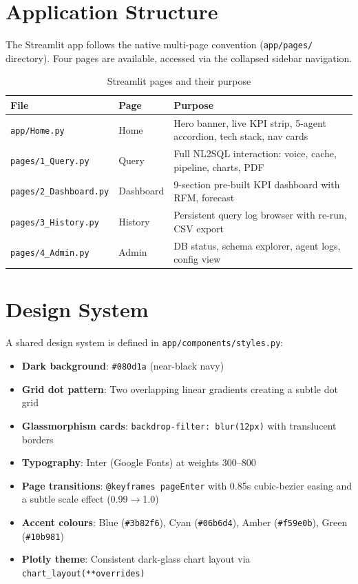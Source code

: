 \documentclass[12pt,a4paper]{report}
\begin{document}
\section{Application Structure}

The Streamlit app follows the native multi-page convention (\texttt{app/pages/} directory).
Four pages are available, accessed via the collapsed sidebar navigation.

\begin{table}[H]
  \centering
  \caption{Streamlit pages and their purpose}
  \label{tab:pages}
  \renewcommand{\arraystretch}{1.3}
  \begin{tabularx}{\textwidth}{llX}
    \toprule
    \textbf{File} & \textbf{Page} & \textbf{Purpose} \\
    \midrule
    \texttt{app/Home.py}     & Home      & Hero banner, live KPI strip, 5-agent accordion, tech stack, nav cards \\
    \texttt{pages/1\_Query.py} & Query   & Full NL2SQL interaction: voice, cache, pipeline, charts, PDF \\
    \texttt{pages/2\_Dashboard.py} & Dashboard & 9-section pre-built KPI dashboard with RFM, forecast \\
    \texttt{pages/3\_History.py}  & History & Persistent query log browser with re-run, CSV export \\
    \texttt{pages/4\_Admin.py}    & Admin   & DB status, schema explorer, agent logs, config view \\
    \bottomrule
  \end{tabularx}
\end{table}

\section{Design System}

A shared design system is defined in \texttt{app/components/styles.py}:

\begin{itemize}[leftmargin=*]
  \item \textbf{Dark background}: \texttt{\#080d1a} (near-black navy)
  \item \textbf{Grid dot pattern}: Two overlapping linear gradients creating a subtle dot grid
  \item \textbf{Glassmorphism cards}: \texttt{backdrop-filter: blur(12px)} with translucent borders
  \item \textbf{Typography}: Inter (Google Fonts) at weights 300--800
  \item \textbf{Page transitions}: \texttt{@keyframes pageEnter} with 0.85s cubic-bezier easing
        and a subtle scale effect (0.99$\to$1.0)
  \item \textbf{Accent colours}: Blue (\texttt{\#3b82f6}), Cyan (\texttt{\#06b6d4}),
        Amber (\texttt{\#f59e0b}), Green (\texttt{\#10b981})
  \item \textbf{Plotly theme}: Consistent dark-glass chart layout via \texttt{chart\_layout(**overrides)}
\end{itemize}
\end{document}

